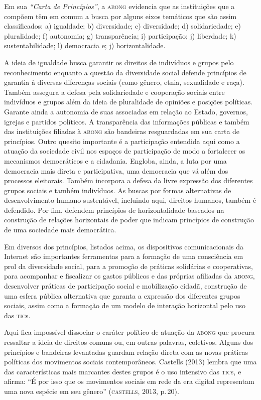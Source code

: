 Em sua \emph{``Carta de Princípios''}, a \textsc{abong} evidencia que as
instituições que a compõem têm em comum a busca por alguns eixos
temáticos que são assim classificados: a) igualdade; b) diversidade; c)
diversidade; d) solidariedade; e) pluralidade; f) autonomia; g)
transparência; i) participação; j) liberdade; k) sustentabilidade; l)
democracia e; j) horizontalidade.

A ideia de igualdade busca garantir os direitos de indivíduos e grupos
pelo reconhecimento enquanto a questão da diversidade social defende
princípios de garantia à diversas diferenças sociais (como gênero,
etnia, sexualidade e raça). Também assegura a defesa pela solidariedade
e cooperação sociais entre indivíduos e grupos além da ideia de
pluralidade de opiniões e posições políticas. Garante ainda a autonomia
de suas associadas em relação ao Estado, governos, igrejas e partidos
políticos. A transparência das informações públicas e também das
instituições filiadas à \textsc{abong} são bandeiras resguardadas em sua carta de
princípios. Outro quesito importante é a participação entendida aqui
como a atuação da sociedade civil nos espaços de participação de modo a
fortalecer os mecanismos democráticos e a cidadania. Engloba, ainda, a
luta por uma democracia mais direta e participativa, uma democracia que
vá além dos processos eleitorais. Também incorpora a defesa da livre
expressão dos diferentes grupos sociais e também indivíduos. As buscas
por formas alternativas de desenvolvimento humano sustentável, incluindo
aqui, direitos humanos, também é defendido. Por fim, defendem princípios
de horizontalidade baseados na construção de relações horizontais de
poder que indicam princípios de construção de uma sociedade mais
democrática.

Em diversos dos princípios, listados acima, os dispositivos
comunicacionais da Internet são importantes ferramentas para a formação
de uma consciência em prol da diversidade social, para a promoção de
práticas solidárias e cooperativas, para acompanhar e fiscalizar os
gastos públicos e das próprias afiliadas da \textsc{abong}, desenvolver práticas
de participação social e mobilização cidadã, construção de uma esfera
pública alternativa que garanta a expressão dos diferentes grupos
sociais, assim como a formação de um modelo de interação horizontal pelo
uso das \textsc{tic}s.

Aqui fica impossível dissociar o caráter político de atuação da \textsc{abong}
que procura ressaltar a ideia de direitos comuns ou, em outras palavras,
coletivos. Alguns dos princípios e bandeiras levantadas guardam relação
direta com as novas práticas políticas dos movimentos sociais
contemporâneos. Castells (2013) lembra que uma das características mais
marcantes destes grupos é o uso intensivo das \textsc{tic}s, e afirma: ``É por
isso que os movimentos sociais em rede da era digital representam uma
nova espécie em seu gênero'' (\textsc{castells}, 2013, p.\,20).

